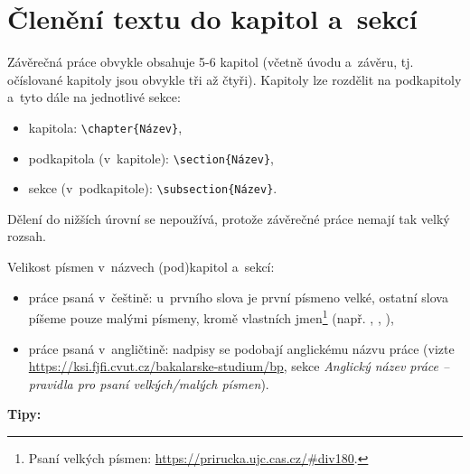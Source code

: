 \section{Členění textu do kapitol a~sekcí}
Závěrečná práce obvykle obsahuje 5-6 kapitol (včetně úvodu a~závěru, tj. očíslované kapitoly jsou obvykle tři až čtyři). Kapitoly lze rozdělit na podkapitoly a~tyto dále na jednotlivé sekce:
\begin{itemize}
\item kapitola: {\texttt{\textbackslash chapter\{Název\}}},
\item podkapitola (v~kapitole): {\texttt{\textbackslash section\{Název\}}},
\item sekce (v~podkapitole):  {\texttt{\textbackslash subsection\{Název\}}}.
\end{itemize}
{\color{red}Dělení do nižších úrovní se nepoužívá}, protože závěrečné práce nemají tak velký rozsah. 
\par
Velikost písmen v~názvech (pod)kapitol a~sekcí:
\begin{itemize}
    \item práce psaná v~češtině: u~prvního slova je  první písmeno velké, ostatní slova píšeme pouze malými písmeny, kromě vlastních jmen\footnote{Psaní velkých písmen: \url{https://prirucka.ujc.cas.cz/\#div180}.} (např. , , ),
    \item práce psaná v~angličtině: nadpisy se podobají anglickému názvu práce (vizte \url{https://ksi.fjfi.cvut.cz/bakalarske-studium/bp}, sekce \textit{Anglický název práce -- pravidla pro psaní velkých/malých písmen}).
\end{itemize}
\par 
{\bf Tipy:} 
